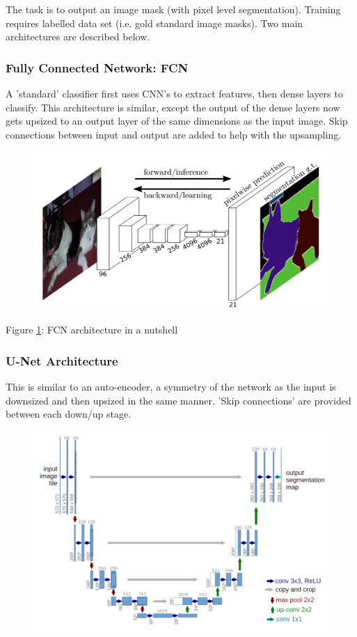 \documentclass[]{article}
\begin{document}
		The task is to output an image mask (with pixel level segmentation). Training requires labelled data set (i.e. gold standard image masks). Two main architectures are described below.
		
		\subsubsection{Fully Connected Network: FCN}
		
			A 'standard' classifier first uses CNN's to extract features, then dense layers to classify. This architecture is similar, except the output of the dense layers now gets upsized to an output layer of the same dimensions as the input image. Skip connections between input and output are added to help with the upsampling.
			
			\begin{figure}[h!]
				\begin{center}
					\includegraphics[width=0.5\linewidth]{./images/fcn.png}
					\label{fig:fcn}
				\end{center}
			\end{figure}
			
			\begin{center}
				Figure \ref{fig:fcn}: FCN architecture in a nutshell
			\end{center}
		\newpage
		\subsubsection{U-Net Architecture}
		
			This is similar to an auto-encoder, a symmetry of the network as the input is downsized and then upsized in the same manner. 'Skip connections' are provided between each down/up stage.
			
		\begin{figure}[h!]
			\begin{center}
				\includegraphics[width=0.5\linewidth]{./images/unet.png}
				\label{fig:unet}
			\end{center}
		\end{figure}
		
\end{document}

